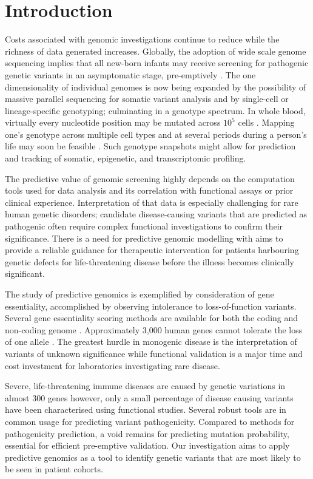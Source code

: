 \documentclass[preprint,11pt,fleqn]{elsarticle}
\begin{document}
\section*{Introduction}
\noindent Costs associated with genomic investigations continue to reduce \citep{payne2018cost} while the richness of data generated increases. 
Globally, the adoption of wide scale genome sequencing implies that all new-born infants may receive screening for pathogenic genetic variants in an asymptomatic stage, pre-emptively \citep{kwan2014newborn}. 
The one dimensionality of individual genomes is now being expanded by the possibility of massive parallel sequencing for somatic variant analysis and by single-cell or lineage-specific genotyping; culminating in a genotype spectrum. 
In whole blood, virtually every nucleotide position may be mutated across $10^5$ cells \citep{Liggett208066}. 
Mapping one's genotype across multiple cell types and at several periods during a person's life may soon be feasible \citep{clark2018scnmt}. 
Such genotype snapshots might allow for prediction and tracking of somatic, epigenetic, and transcriptomic profiling. 

The predictive value of genomic screening highly depends on the computation tools used for data analysis and its correlation with functional assays or prior clinical experience.
Interpretation of that data is especially challenging for rare human genetic disorders; candidate disease-causing variants that are predicted as pathogenic often require complex functional investigations to confirm their significance.
There is a need for predictive genomic modelling with aims to provide a reliable guidance for therapeutic intervention for patients harbouring genetic defects for life-threatening disease before the illness becomes clinically significant. 


The study of predictive genomics is exemplified by consideration of gene essentiality, accomplished by observing intolerance to loss-of-function variants. 
Several gene essentiality scoring methods are available for both the coding and non-coding genome  \citep{bartha2017human}. 
Approximately 3,000 human genes cannot tolerate the loss of one allele \citep{bartha2017human}. 
The greatest hurdle in monogenic disease is the interpretation of variants of unknown significance while functional validation is a major time and cost investment for laboratories investigating rare disease. 

Severe, life-threatening immune diseases are caused by genetic variations in almost 300 genes  \citep{picard2018international, conley2014discovery} however, only a small percentage of disease causing variants have been characterised using functional studies. 
Several robust tools are in common usage for predicting variant pathogenicity. 
Compared to methods for pathogenicity prediction, a void remains for predicting mutation probability, essential for efficient pre-emptive validation.
Our investigation aims to apply predictive genomics as a tool to identify genetic variants that are most likely to be seen in patient cohorts.
\end{document}
